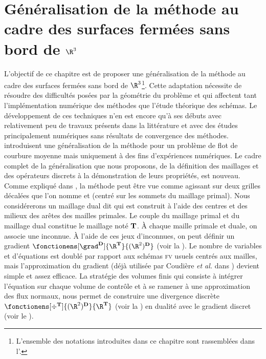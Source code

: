 \chapter{Généralisation de la méthode \ddfv au cadre des surfaces fermées sans bord de \texorpdfstring{$\R^3$}{R3}} \label{chap:generalisation_ddfv}

\localtableofcontents

\medskip

L'objectif de ce chapitre est de proposer une généralisation de la méthode \ddfv au cadre des surfaces fermées sans bord de $\R^3$\footnote{L'ensemble des notations introduites dans ce chapitre sont rassemblées dans l'.}. Cette adaptation nécessite de résoudre des difficultés posées par la géométrie du problème et qui affectent tant l’implémentation numérique des méthodes que l’étude théorique des schémas. Le développement de ces techniques n'en est encore qu'à ses débuts avec relativement peu de travaux présents dans la littérature et avec des études principalement numériques sans résultats de convergence des méthodes. \cite{tomek_discrete_2016,tomek_discrete_2019} introduisent une généralisation de la méthode pour un problème de flot de courbure moyenne mais uniquement à des fins d'expériences numériques. Le cadre complet de la généralisation que nous proposons, de la définition des maillages et des opérateurs discrets à la démonstration de leurs propriétés, est nouveau. \\

Comme expliqué dans \cite[Chapitre I]{krell_schemas_2010}, la méthode \ddfv peut être vue comme agissant sur deux grilles décalées que l'on nomme  et  (centré sur les sommets du maillage primal). Nous considérerons un maillage dual dit  qui est construit à l'aide des centres et des milieux des arêtes des mailles primales. Le couple du maillage primal et du maillage dual constitue le maillage \ddfv noté $\mathbf{T}$. À chaque maille primale et duale, on associe une inconnue. À l'aide de ces jeux d'inconnues, on peut définir un gradient \ddfv $\fonctionens[\grad^\ensdiamantplat]{\R^\ensddfvplat}{(\R^2)^\ensdiamantplat}$ (voir la ). Le nombre de variables et d'équations est doublé par rapport aux schémas \textsc{fv} usuels centrés aux mailles, mais l'approximation du gradient (déjà utilisée par Coudière \emph{et al.} dans \cite{coudiere_convergence_1999}) devient simple et assez efficace. La stratégie des volumes finis qui consiste à intégrer l'équation sur chaque volume de contrôle et à se ramener à une approximation des flux normaux, nous permet de construire une divergence discrète $\fonctionens[\div^\ensddfvplat]{(\R^2)^\ensdiamantplat}{\R^\ensddfvplat}$ (voir la ) en dualité avec le gradient discret (voir le ). \\


